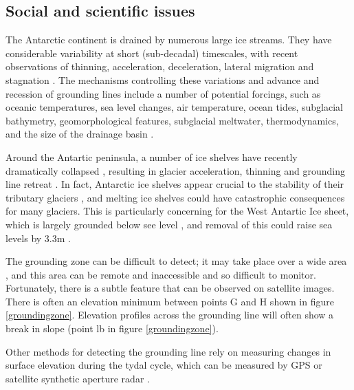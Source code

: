 \documentclass[a4paper,12pt]{article}
\begin{document}
\subsection{Social and scientific issues}

The Antarctic continent is drained by numerous large ice streams. They have considerable variability at short (sub-decadal) timescales, with recent observations of thinning, acceleration, deceleration, lateral migration and stagnation \cite[]{livingstone2012antarctic}. The mechanisms controlling these variations and advance and recession of grounding lines include a number of potential forcings, such as oceanic temperatures, sea level changes, air temperature, ocean tides, subglacial bathymetry, geomorphological features, subglacial meltwater, thermodynamics, and the size of the drainage basin \cite[]{livingstone2012antarctic}.

Around the Antartic peninsula, a number of ice shelves have recently dramatically collapsed \cite[]{cook2010overview,scambos2009ice}, resulting in glacier acceleration, thinning and grounding line retreat \cite[]{pritchard2007widespread,rignot2004accelerated}. In fact, Antarctic ice shelves appear crucial to the stability of their tributary glaciers \cite[]{pritchard2012antarctic}, and melting ice shelves could have catastrophic consequences for many glaciers. This is particularly concerning for the West Antartic Ice sheet, which is largely grounded below see level \cite[]{lythe2001bedmap}, and removal of this could raise sea levels by 3.3m \cite[]{bamber2009reassessment,mercer1978west}.

The grounding zone can be difficult to detect; it may take place over a wide area \cite[]{fricker2009mapping}, and this area can be remote and inaccessible and so difficult to monitor. Fortunately, there is a subtle feature that can be observed on satellite images. There is often an elevation minimum between points G and H shown in figure \ref{groundingzone}. Elevation profiles across the grounding line will often show a break in slope (point lb in figure \ref{groundingzone}). 

Other methods for detecting the grounding line rely on measuring changes in surface elevation during the tydal cycle, which can be measured by GPS or satellite synthetic aperture radar \cite[]{rignot2011antarctic,fricker2009mapping,brunt2010mapping}.
\end{document}
